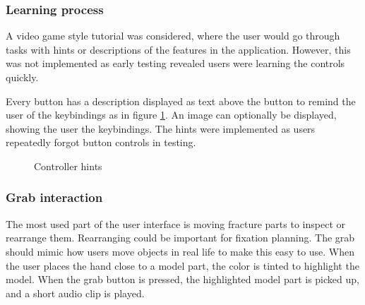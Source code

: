 \documentclass[a4paper]{report}
\begin{document}
\subsubsection{Learning process}
A video game style tutorial was considered, where the user would go through tasks with hints or descriptions of the features in the application. However, this was not implemented as early testing revealed users were learning the controls quickly.

Every button has a description displayed as text above the button to remind the user of the keybindings as in figure \ref{hints}. An image can optionally be displayed, showing the user the keybindings. The hints were implemented as users repeatedly forgot button controls in testing.

\begin{figure}[h!]
    \centering
	\hfill
  \caption{Controller hints}\label{hints}
  \small
\end{figure}

\subsubsection{Grab interaction}

The most used part of the user interface is moving fracture parts to inspect or rearrange them. Rearranging could be important for fixation planning.
The grab should mimic how users move objects in real life to make this easy to use. When the user places the hand close to a model part, the color is tinted to highlight the model. When the grab button is pressed, the highlighted model part is picked up, and a short audio clip is played.
\end{document}
